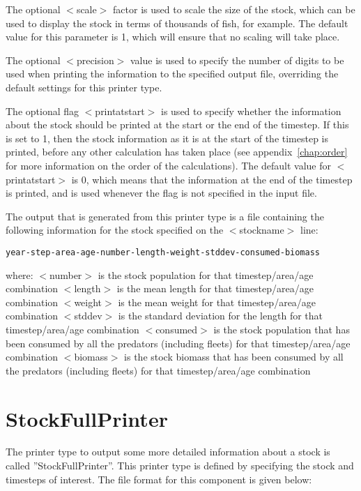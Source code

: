 \documentclass[10pt,twoside]{book}
\begin{document}
The optional $<$scale$>$ factor is used to scale the size of the stock, which can be used to display the stock in terms of thousands of fish, for example.  The default value for this parameter is 1, which will ensure that no scaling will take place.

\bigskip
The optional $<$precision$>$ value is used to specify the number of digits to be used when printing the information to the specified output file, overriding the default settings for this printer type.

\bigskip
The optional flag $<$printatstart$>$ is used to specify whether the information about the stock should be printed at the start or the end of the timestep.  If this is set to 1, then the stock information as it is at the start of the timestep is printed, before any other calculation has taken place (see appendix~\ref{chap:order} for more information on the order of the calculations).  The default value for $<$printatstart$>$ is 0, which means that the information at the end of the timestep is printed, and is used whenever the flag is not specified in the input file.

\bigskip
The output that is generated from this printer type is a file containing the following information for the stock specified on the $<$stockname$>$ line:

{\small\begin{verbatim}
year-step-area-age-number-length-weight-stddev-consumed-biomass
\end{verbatim}}

where:\newline
$<$number$>$ is the stock population for that timestep/area/age combination\newline
$<$length$>$ is the mean length for that timestep/area/age combination\newline
$<$weight$>$ is the mean weight for that timestep/area/age combination\newline
$<$stddev$>$ is the standard deviation for the length for that timestep/area/age combination\newline
$<$consumed$>$ is the stock population that has been consumed by all the predators (including fleets) for that timestep/area/age combination\newline
$<$biomass$>$ is the stock biomass that has been consumed by all the predators (including fleets) for that timestep/area/age combination

\section{StockFullPrinter}\label{sec:stockfullprinter}
The printer type to output some more detailed information about a stock is called ''StockFullPrinter''.  This printer type is defined by specifying the stock and timesteps of interest.  The file format for this component is given below:
\end{document}
